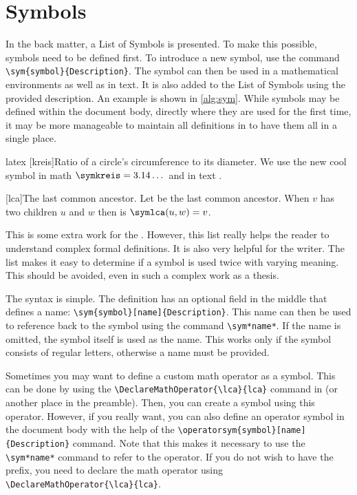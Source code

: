 \section{Symbols}%
\label{sec:sym}

In the back matter, a List of Symbols is presented. To make this possible,
symbols need to be defined first.  To introduce a new symbol, use the
command \verb!\sym{symbol}{Description}!.  The symbol can then be used in a
mathematical environments as well as in text. It is also added to the List of
Symbols using the provided description.  An example is shown in
\autoref{alg:sym}. While symbols may be defined within the document body, \eg
directly where they are used for the first time, it may be more manageable to
maintain all definitions in  to have them all in a
single place.

\begin{algorithm}
    \label{alg:sym}
\begin{code}{latex}
\sym{\pi}[kreis]{Ratio of a circle's
    circumference to its diameter.}
We use the new cool symbol in math
$\symkreis = 3.14\dots$ and in text \symkreis.

[lca]{The last common ancestor.}
Let \symlca be the last common ancestor. When $v$ has
two children $u$ and $w$ then is $\symlca(u,w)=v$.
\end{code}
\end{algorithm}

This is some extra work for the . However, this list
really helps the reader to understand complex formal definitions. It is also
very helpful for the writer. The list makes it easy to determine if a symbol
is used twice with varying meaning. This should be avoided, even in such a
complex work as a thesis.

The syntax is simple. The definition has an optional field in the middle that
defines a name: \verb!\sym{symbol}[name]{Description}!. This name can then be
used to reference back to the symbol using the command \verb!\sym*name*!. If
the name is omitted, the symbol itself is used as the name. This works only if
the symbol consists of regular letters, otherwise a name must be provided.

Sometimes you may want to define a custom math operator as a symbol. This can
be done by using the \verb!\DeclareMathOperator{\lca}{lca}! command in
 (or another place in the preamble).  Then, you
can create a symbol using this operator. However, if you really want, you can
also define an operator symbol in the document body with the help of
the \verb!\operatorsym{symbol}[name]{Description}! command. Note that this
makes it necessary to use the \verb!\sym*name*! command to refer to the
operator. If you do not wish to have the  prefix, you need to declare
the math operator using \verb!\DeclareMathOperator{\lca}{lca}!.

